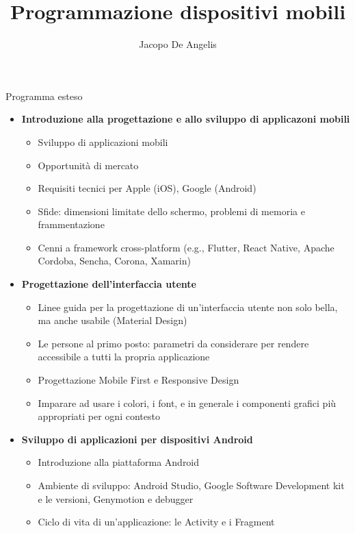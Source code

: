 \documentclass[11pt,a4paper]{book}
\begin{document}
\title{Programmazione dispositivi mobili}
\author{Jacopo De Angelis}
\maketitle

\pagebreak
\tableofcontents
\pagebreak

\begin{LARGE}
Programma esteso
\end{LARGE}

\begin{itemize}
	\item \textbf{Introduzione alla progettazione e allo sviluppo di applicazoni mobili}
	\begin{itemize}
		\item Sviluppo di applicazioni mobili
		\item Opportunità di mercato
		\item Requisiti tecnici per Apple (iOS), Google (Android)
		\item Sfide: dimensioni limitate dello schermo, problemi di memoria e frammentazione
		\item Cenni a framework cross-platform (e.g., Flutter, React Native, Apache Cordoba, Sencha, Corona, Xamarin)
	\end{itemize}
	\item \textbf{Progettazione dell'interfaccia utente}
	\begin{itemize}
		\item Linee guida per la progettazione di un'interfaccia utente non solo bella, ma anche usabile (Material Design)
		\item Le persone al primo posto: parametri da considerare per rendere accessibile a tutti la propria applicazione
		\item Progettazione Mobile First e Responsive Design
		\item Imparare ad usare i colori, i font, e in generale i componenti grafici più appropriati per ogni contesto
	\end{itemize}
	\item \textbf{Sviluppo di applicazioni per dispositivi Android}
	\begin{itemize}
		\item Introduzione alla piattaforma Android
		\item Ambiente di sviluppo: Android Studio, Google Software Development kit e le versioni, Genymotion e debugger
		\item Ciclo di vita di un'applicazione: le Activity e i Fragment

\end{itemize}
\end{itemize}
\end{document}
